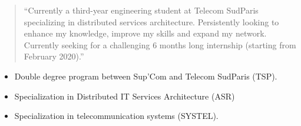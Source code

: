 \documentclass[9pt,a4paper,ragged2e,normalphoto]{altacv}
\begin{document}

\begin{fullwidth}
\makecvheader
\end{fullwidth}


\begin{quote}
``Currently a third-year engineering student at Telecom SudParis specializing in distributed services architecture. Persistently
looking to enhance my knowledge,
improve my skills and expand my network.
Currently seeking for a challenging 6
months long internship (starting from
February 2020).''
\end{quote}


\begin{itemize}
\item Double degree program between Sup'Com and Telecom SudParis (TSP).
\item Specialization in Distributed IT Services Architecture (ASR)
\end{itemize}
\divider

\begin{itemize}
\item Specialization in telecommunication systems (SYSTEL).
\end{itemize}
\divider
\end{document}
